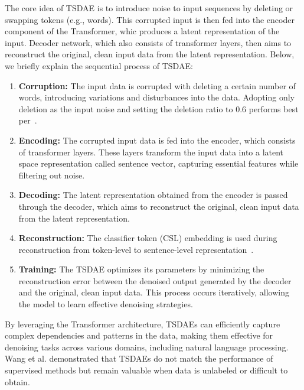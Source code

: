 \documentclass[fleqn,moreauthors,10pt]{ds_report}
\begin{document}
The core idea of TSDAE is to introduce noise to input sequences by deleting or swapping tokens (e.g., words). 
This corrupted input is then fed into the encoder component of the Transformer, whic produces a latent representation of the input.
Decoder network, which also consists of transformer layers, then aims to reconstruct the original, clean input data from the latent representation. 
Below, we briefly explain the sequential process of TSDAE:


\begin{enumerate}
    \item \textbf{Corruption:} The input data is corrupted with deleting a certain number of words, introducing variations and disturbances into the data. Adopting only deletion as the input noise and setting the deletion ratio to 0.6 performs best per~\cite{wang2021tsdae}.
    \item \textbf{Encoding:} The corrupted input data is fed into the encoder, which consists of transformer layers. These layers transform the input data into a latent space representation called sentence vector, capturing essential features while filtering out noise.
    \item \textbf{Decoding:} The latent representation obtained from the encoder is passed through the decoder, which aims to reconstruct the original, clean input data from the latent representation.
    \item \textbf{Reconstruction:} The classifier token (CSL) embedding is used during reconstruction from token-level to sentence-level representation~\cite{pinecone_2021}.
    \item \textbf{Training:} The TSDAE optimizes its parameters by minimizing the reconstruction error between the denoised output generated by the decoder and the original, clean input data. This process occurs iteratively, allowing the model to learn effective denoising strategies.
\end{enumerate}




By leveraging the Transformer architecture, TSDAEs can efficiently capture complex dependencies and patterns in the data, making them effective for denoising tasks across various domains, including natural language processing. 
Wang et al. \cite{wang2021tsdae} demonstrated that TSDAEs do not match the performance of supervised methods but remain valuable when data is unlabeled or difficult to obtain.
\end{document}
